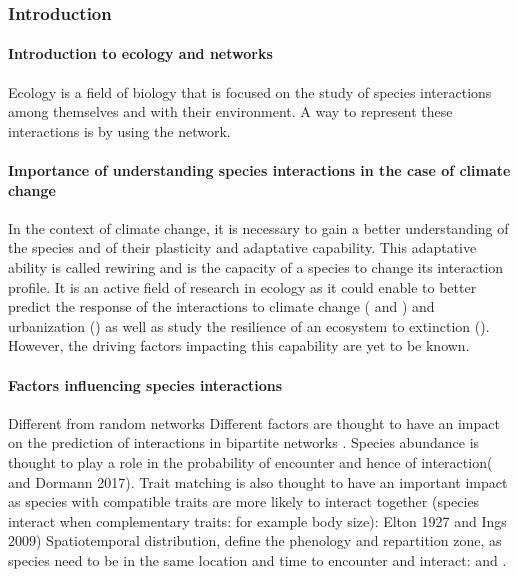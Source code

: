 \subsubsection{Introduction}

\paragraph{Introduction to ecology and networks}
Ecology is a field of biology that is focused on the study of species interactions among themselves and with their environment. A way to represent these interactions is by using the network. 

\paragraph{Importance of understanding species interactions in the case of climate change}
In the context of climate change, it is necessary to gain a better understanding of the species and of their plasticity and adaptative capability. This adaptative ability is called rewiring and is the capacity of a species to change its interaction profile. It is an active field of research in ecology as it could enable to better predict the response of the interactions to climate change (\cite{schleuning_trait-based_2020} and \cite{benadi_specialization_2014}) and urbanization (\cite{marcacci_urbanization_2023}) as well as study the resilience of an ecosystem to extinction (\cite{vizentin-bugoni_rewire_2023}). However, the driving factors impacting this capability are yet to be known.


\paragraph{Factors influencing species interactions}
Different from random networks
Different factors are thought to have an impact on the prediction of interactions in bipartite networks \cite{benadi_quantitative_2022}. Species abundance is thought to play a role in the probability of encounter and hence of interaction(\cite{poisot_beyond_2015} and Dormann 2017\cite{dormann_identifying_2017}).
Trait matching is also thought to have an important impact as species with compatible traits are more likely to interact together (species interact when complementary traits: for example body size): Elton 1927 and Ings 2009)
Spatiotemporal distribution, define the phenology and repartition zone, as species need to be in the same location and time to encounter and interact: \cite{caradonna_seeing_2021} and \cite{tylianakis_ecological_2017}.


